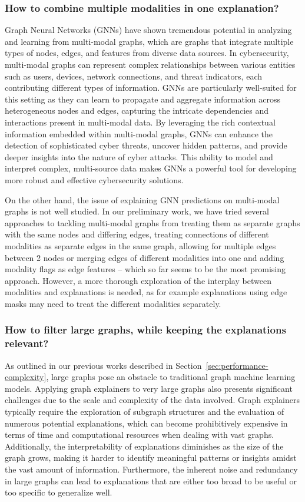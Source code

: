 \subsubsection{How to combine multiple modalities in one explanation?}

Graph Neural Networks (GNNs) have shown tremendous potential in analyzing and learning from multi-modal graphs, which are graphs that integrate multiple types of nodes, edges, and features from diverse data sources. In cybersecurity, multi-modal graphs can represent complex relationships between various entities such as users, devices, network connections, and threat indicators, each contributing different types of information. GNNs are particularly well-suited for this setting as they can learn to propagate and aggregate information across heterogeneous nodes and edges, capturing the intricate dependencies and interactions present in multi-modal data. By leveraging the rich contextual information embedded within multi-modal graphs, GNNs can enhance the detection of sophisticated cyber threats, uncover hidden patterns, and provide deeper insights into the nature of cyber attacks. This ability to model and interpret complex, multi-source data makes GNNs a powerful tool for developing more robust and effective cybersecurity solutions.

On the other hand, the issue of explaining GNN predictions on multi-modal graphs is not well studied. In our preliminary work, we have tried several approaches to tackling multi-modal graphs from treating them as separate graphs with the same nodes and differing edges, treating connections of different modalities as separate edges in the same graph, allowing for multiple edges between 2 nodes or merging edges of different modalities into one and adding modality flags as edge features -- which so far seems to be the most promising approach. However, a more thorough exploration of the interplay between modalities and explanations is needed, as for example explanations using edge masks may need to treat the different modalities separately.

\subsubsection{How to filter large graphs, while keeping the explanations relevant?}

As outlined in our previous works described in Section~\ref{sec:performance-complexity}, large graphs pose an obstacle to traditional graph machine learning models. Applying graph explainers to very large graphs also presents significant challenges due to the scale and complexity of the data involved. Graph explainers typically require the exploration of subgraph structures and the evaluation of numerous potential explanations, which can become prohibitively expensive in terms of time and computational resources when dealing with vast graphs. Additionally, the interpretability of explanations diminishes as the size of the graph grows, making it harder to identify meaningful patterns or insights amidst the vast amount of information. Furthermore, the inherent noise and redundancy in large graphs can lead to explanations that are either too broad to be useful or too specific to generalize well.

